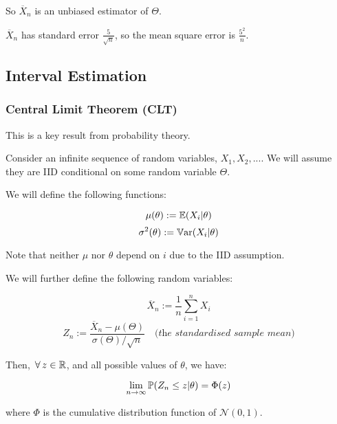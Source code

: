 \documentclass[a4paper]{article}
\begin{document}
                So $\overline X_n$ is an unbiased estimator of $\Theta$.

                $\overline X_n$ has standard error $\frac{5}{\sqrt{n}}$, so the
                mean square error is $\frac{5^2}{n}$.

        \subsection{Interval Estimation}
            \begin{fread}
                [MR03, section 8.1, 8.2.1]
            \end{fread}

            \subsubsection{Central Limit Theorem (CLT)}
                This is a key result from probability theory.

                Consider an infinite sequence of random variables, $X_1, X_2,
                ...$. We will assume they are IID conditional on some random
                variable $\Theta$.

                We will define the following functions:

                \[
                    \mu(\theta) := \mathbb{E}(X_i | \theta)
                \]
                \[
                    \sigma^2(\theta) := \mathbb{V}\text{ar}(X_i | \theta)
                \]

                Note that neither $\mu$ nor $\theta$ depend on $i$ due to the
                IID assumption.

                We will further define the following random variables:

                \[
                    \overline X_n := \frac{1}{n} \sum_{i=1}^n X_i
                \]
                \[
                    Z_n := \frac{\overline X_n - \mu(\Theta)}{\sigma(\Theta) /
                    \sqrt{n}} \quad \textit{(the standardised sample mean)}
                \]

                Then, $\,\forall\, z \in \mathbb{R}$, and all possible values of $\theta$, we
                have:

                \[
                    \lim_{n \to \infty} \mathbb{P}(Z_n \leq z | \theta) = \Phi(z)
                \]

                where $\Phi$ is the cumulative distribution function of
                $\mathcal{N}(0, 1)$.
\end{document}
